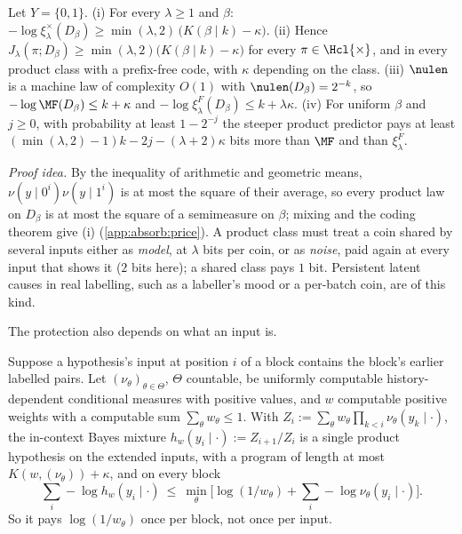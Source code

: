 \begin{proposition}\label{prop:absorb:price}
Let $Y=\{0,1\}$.
(i) For every $\lambda\ge1$ and $\beta$: $-\log\xi^\times_\lambda(D_\beta)\ge\min(\lambda,2)\,\big(K(\beta\mid k)-\kappa\big)$. (ii) Hence $J_\lambda(\pi;D_\beta)\ge\min(\lambda,2)\big(K(\beta\mid k)-\kappa\big)$ for every $\pi\in\Hcl{\times}$, and in every product class with a prefix-free code, with $\kappa$ depending on the class. (iii) $\nulen$ is a machine law of complexity $O(1)$ with $\nulen(D_\beta)=2^{-k}$, so $-\log\MF(D_\beta)\le k+\kappa$ and $-\log\xi^F_\lambda(D_\beta)\le k+\lambda\kappa$. (iv) For uniform $\beta$ and $j\ge0$, with probability at least $1-2^{-j}$ the steeper product predictor pays at least $(\min(\lambda,2)-1)k-2j-(\lambda+2)\kappa$ bits more than $\MF$ and than $\xi^F_\lambda$.
\end{proposition}

\emph{Proof idea.} By the inequality of arithmetic and geometric means, $\nu(y\mid0^i)\nu(y\mid1^i)$ is at most the square of their average, so every product law on $D_\beta$ is at most the square of a semimeasure on $\beta$; mixing and the coding theorem give (i) (\cref{app:absorb:price}). A product class must treat a coin shared by several inputs either as \emph{model}, at $\lambda$ bits per coin, or as \emph{noise}, paid again at every input that shows it ($2$ bits here); a shared class pays $1$ bit. Persistent latent causes in real labelling, such as a labeller's mood or a per-batch coin, are of this kind.

The protection also depends on what an input is.

\begin{proposition}\label{prop:absorb:history}
Suppose a hypothesis's input at position $i$ of a block contains the block's earlier labelled pairs. Let $(\nu_\theta)_{\theta\in\Theta}$, $\Theta$ countable, be uniformly computable history-dependent conditional measures with positive values, and $w$ computable positive weights with a computable sum $\sum_\theta w_\theta\le1$. With $Z_i:=\sum_\theta w_\theta\prod_{k<i}\nu_\theta(y_k\mid\cdot)$, the in-context Bayes mixture $h_w(y_i\mid\cdot):=Z_{i+1}/Z_i$ is a single product hypothesis on the extended inputs, with a program of length at most $K(w,(\nu_\theta))+\kappa$, and on every block
\[
\textstyle\sum_i-\log h_w(y_i\mid\cdot)\ \le\ \min_\theta\big[\log(1/w_\theta)+\sum_i-\log\nu_\theta(y_i\mid\cdot)\big].
\]
So it pays $\log(1/w_\theta)$ once per block, not once per input.
\end{proposition}


